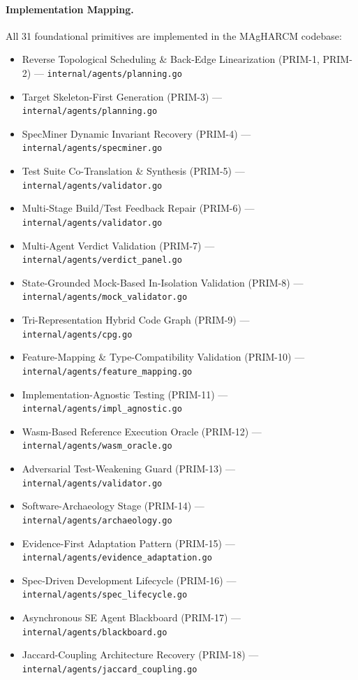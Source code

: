 \paragraph{Implementation Mapping.}
All 31 foundational primitives are implemented in the MAgHARCM codebase:
\begin{itemize}
\item Reverse Topological Scheduling \& Back-Edge Linearization (PRIM-1, PRIM-2) --- \texttt{internal/agents/planning.go}
\item Target Skeleton-First Generation (PRIM-3) --- \texttt{internal/agents/planning.go}
\item SpecMiner Dynamic Invariant Recovery (PRIM-4) --- \texttt{internal/agents/specminer.go}
\item Test Suite Co-Translation \& Synthesis (PRIM-5) --- \texttt{internal/agents/validator.go}
\item Multi-Stage Build/Test Feedback Repair (PRIM-6) --- \texttt{internal/agents/validator.go}
\item Multi-Agent Verdict Validation (PRIM-7) --- \texttt{internal/agents/verdict\_panel.go}
\item State-Grounded Mock-Based In-Isolation Validation (PRIM-8) --- \texttt{internal/agents/mock\_validator.go}
\item Tri-Representation Hybrid Code Graph (PRIM-9) --- \texttt{internal/agents/cpg.go}
\item Feature-Mapping \& Type-Compatibility Validation (PRIM-10) --- \texttt{internal/agents/feature\_mapping.go}
\item Implementation-Agnostic Testing (PRIM-11) --- \texttt{internal/agents/impl\_agnostic.go}
\item Wasm-Based Reference Execution Oracle (PRIM-12) --- \texttt{internal/agents/wasm\_oracle.go}
\item Adversarial Test-Weakening Guard (PRIM-13) --- \texttt{internal/agents/validator.go}
\item Software-Archaeology Stage (PRIM-14) --- \texttt{internal/agents/archaeology.go}
\item Evidence-First Adaptation Pattern (PRIM-15) --- \texttt{internal/agents/evidence\_adaptation.go}
\item Spec-Driven Development Lifecycle (PRIM-16) --- \texttt{internal/agents/spec\_lifecycle.go}
\item Asynchronous SE Agent Blackboard (PRIM-17) --- \texttt{internal/agents/blackboard.go}
\item Jaccard-Coupling Architecture Recovery (PRIM-18) --- \texttt{internal/agents/jaccard\_coupling.go}

\end{itemize}
